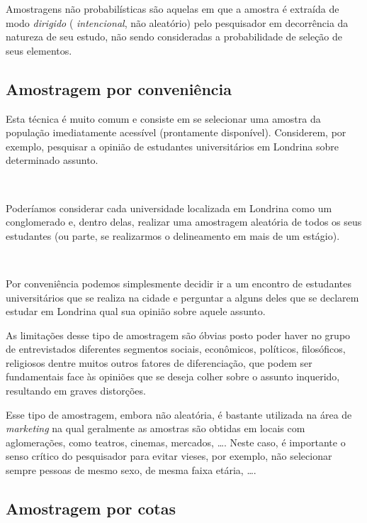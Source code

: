 \documentclass[
]{book}
\begin{document}
\hfill\break

Amostragens não probabilísticas são aquelas em que a amostra é extraída de modo \emph{dirigido} ( \emph{intencional}, não aleatório) pelo pesquisador em decorrência da natureza de seu estudo, não sendo consideradas a probabilidade de seleção de seus elementos.

\hypertarget{amostragem-por-conveniuxeancia}{%
\subsection{Amostragem por conveniência}\label{amostragem-por-conveniuxeancia}}

\hfill\break

Esta técnica é muito comum e consiste em se selecionar uma amostra da população imediatamente acessível (prontamente disponível). Considerem, por exemplo, pesquisar a opinião de estudantes universitários em Londrina sobre determinado assunto.

~

Poderíamos considerar cada universidade localizada em Londrina como um conglomerado e, dentro delas, realizar uma amostragem aleatória de todos os seus estudantes (ou parte, se realizarmos o delineamento em mais de um estágio).

~

Por conveniência podemos simplesmente decidir ir a um encontro de estudantes universitários que se realiza na cidade e perguntar a alguns deles que se declarem estudar em Londrina qual sua opinião sobre aquele assunto.

\hfill\break

As limitações desse tipo de amostragem são óbvias posto poder haver no grupo de entrevistados diferentes segmentos sociais, econômicos, políticos, filosóficos, religiosos dentre muitos outros fatores de diferenciação, que podem ser fundamentais face às opiniões que se deseja colher sobre o assunto inquerido, resultando em graves distorções.

\hfill\break

Esse tipo de amostragem, embora não aleatória, é bastante utilizada na área de \emph{marketing} na qual geralmente as amostras são obtidas em locais com aglomerações, como teatros, cinemas, mercados, \ldots. Neste caso, é importante o senso crítico do pesquisador para evitar vieses, por exemplo, não selecionar sempre pessoas de mesmo sexo, de mesma faixa etária, \ldots.

\hypertarget{amostragem-por-cotas}{%
\subsection{Amostragem por cotas}\label{amostragem-por-cotas}}
\end{document}
